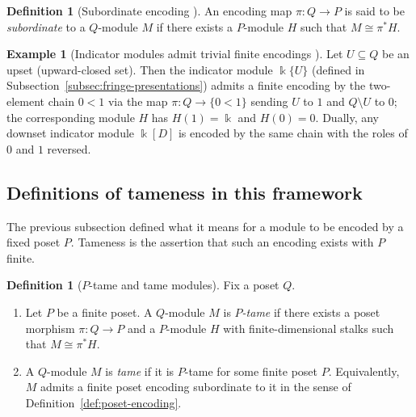 \documentclass{article}
\newcommand{\kk}{\Bbbk}
\newcommand{\<}{\langle}
\renewcommand{\>}{\rangle}
\theoremstyle{definition}
\newtheorem{defn}[theorem]{Definition}
\newtheorem{example}[theorem]{Example}
\theoremstyle{remark}
\begin{document}
	\begin{defn}[Subordinate encoding {\cite[Def.~4.7]{Mil20}}]
		\label{def:subordinate}
		An encoding map $\pi\colon Q\to P$ is said to be \emph{subordinate} to a $Q$-module $M$
		if there exists a $P$-module $H$ such that $M\cong \pi^*H$.
	\end{defn}
	
	\begin{example}[Indicator modules admit trivial finite encodings {\cite[Ex.~4.6]{Mil20}}]
		\label{ex:indicator-encoding}
		Let $U\subseteq Q$ be an upset (upward-closed set).  Then the indicator module $\kk\{U\}$
		(defined in Subsection~\ref{subsec:fringe-presentations}) admits a finite encoding by the
		two-element chain $0<1$ via the map $\pi\colon Q\to\{0<1\}$ sending $U$ to $1$ and
		$Q\setminus U$ to $0$; the corresponding module $H$ has $H(1)=\kk$ and $H(0)=0$.
		Dually, any downset indicator module $\kk[D]$ is encoded by the same chain with the
		roles of $0$ and $1$ reversed.
	\end{example}
	
	\subsection{Definitions of tameness in this framework}
	\label{subsec:def-tameness}
	
	The previous subsection defined what it means for a module to be encoded by a fixed
	poset $P$.  Tameness is the assertion that such an encoding exists with $P$ finite.
	
	\begin{defn}[$P$-tame and tame modules]
		\label{def:tame-module}
		Fix a poset $Q$.
		\begin{enumerate}[label=(\roman*)]
			\item Let $P$ be a finite poset.  A $Q$-module $M$ is \emph{$P$-tame} if there exists a
			poset morphism $\pi\colon Q\to P$ and a $P$-module $H$ with finite-dimensional stalks
			such that $M\cong \pi^*H$.
			\item A $Q$-module $M$ is \emph{tame} if it is $P$-tame for some finite poset $P$.
			Equivalently, $M$ admits a finite poset encoding subordinate to it in the sense of
			Definition~\ref{def:poset-encoding}.
		\end{enumerate}
	\end{defn}
	
\end{document}
